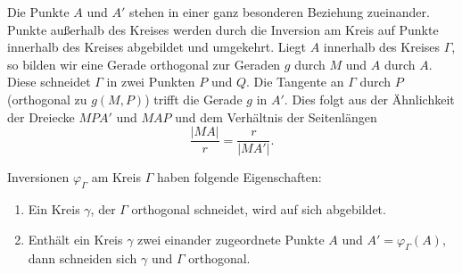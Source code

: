 Die Punkte $A$ und $A'$ stehen in einer ganz besonderen Beziehung zueinander. Punkte außerhalb des
Kreises werden durch die Inversion am Kreis auf Punkte innerhalb des Kreises abgebildet und
umgekehrt. Liegt $A$ innerhalb des Kreises $\Gamma$, so bilden wir eine Gerade orthogonal zur
Geraden $g$ durch $M$ und $A$ durch $A$. Diese schneidet $\Gamma$ in zwei Punkten $P$ und $Q$. Die
Tangente an $\Gamma$ durch $P$ (orthogonal zu $g(M,P)$) trifft die Gerade $g$ in $A'$. Dies folgt
aus der Ähnlichkeit der Dreiecke $MPA'$ und $MAP$ und dem Verhältnis der Seitenlängen
$$
    \frac{|MA|}{r} = \frac{r}{|MA'|}.
$$
\begin{thm}\label{thm:satz.s4b}
    Inversionen $\varphi_\Gamma$ am Kreis $\Gamma$ haben folgende Eigenschaften:

    \renewcommand{\labelenumi}{\alph{enumi})} %
    \begin{enumerate}
        \item Ein Kreis $\gamma$, der $\Gamma$ orthogonal schneidet, wird auf sich abgebildet.

        \item Enthält ein Kreis $\gamma$ zwei einander zugeordnete Punkte $A$ und
            $A' = \varphi_\Gamma(A)$, dann schneiden sich $\gamma$ und $\Gamma$ orthogonal.

    \end{enumerate}
\end{thm}

